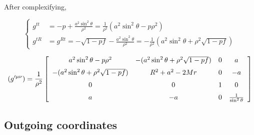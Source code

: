 \documentclass{article}
\newcommand{\be}{\begin{equation}}
\newcommand{\ee}{\end{equation}}
\newcommand{\ba}{\begin{array}}
\newcommand{\ea}{\end{array}}
\newcommand{\1}{\left}
\newcommand{\2}{\right}
\begin{document}
After complexifying,

\be
\1\{ 
\begin{split}
g^{tt}&=-p+\frac{a^2\sin^2\theta}{\rho^2}=\frac{1}{\rho^2}(a^2\sin^2\theta-p\rho^2)\\
g^{tR}&=g^{Rt}=-\sqrt{1-pf}-\frac{a^2\sin^2\theta}{\rho^2}=-\frac{1}{\rho^2}(a^2\sin^2\theta+\rho^2\sqrt{1-pf})
\end{split}
\2.
\ee

\be
(g^{\prime\mu\nu})=\frac{1}{\rho^2}\left[\ba{cccc}a^2\sin^2\theta-p\rho^2&-(a^2\sin^2\theta+\rho^2\sqrt{1-pf})&0&a\\ \noalign{\medskip}-(a^2\sin^2\theta+\rho^2\sqrt{1-pf})&R^2+a^2-2Mr&0&-a\\ \noalign{\medskip}0&0&1&0\\ \noalign{\medskip}a&-a&0&\frac 1 {\sin^2\theta}\ea\right]
\ee

\subsection{Outgoing coordinates}
\end{document}
